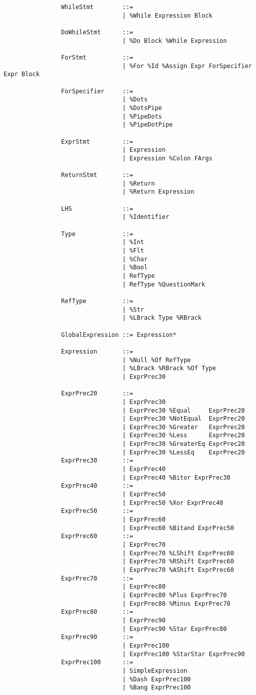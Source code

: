 \documentclass{article}
\begin{document}
\begin{verbatim}
				WhileStmt        ::=
				                 | %While Expression Block
				
				DoWhileStmt      ::=
				                 | %Do Block %While Expression
				                 
				ForStmt          ::=
				                 | %For %Id %Assign Expr ForSpecifier Expr Block
				                 
				ForSpecifier     ::=
				                 | %Dots
				                 | %DotsPipe
				                 | %PipeDots
				                 | %PipeDotPipe
				                 
				ExprStmt         ::=
				                 | Expression
				                 | Expression %Colon FArgs
				                 
				ReturnStmt       ::=
				                 | %Return
				                 | %Return Expression
				                 
				LHS              ::=
				                 | %Identifier
				                 
				Type             ::=
				                 | %Int
				                 | %Flt
				                 | %Char
				                 | %Bool
				                 | RefType
				                 | RefType %QuestionMark
				                 
				RefType          ::=
				                 | %Str
				                 | %LBrack Type %RBrack
				                 
				GlobalExpression ::= Expression*
			
				Expression       ::=
				                 | %Null %Of RefType
				                 | %LBrack %RBrack %Of Type
				                 | ExprPrec30
				
				ExprPrec20       ::= 
				                 | ExprPrec30
				                 | ExprPrec30 %Equal     ExprPrec20
				                 | ExprPrec30 %NotEqual  ExprPrec20
				                 | ExprPrec30 %Greater   ExprPrec20
				                 | ExprPrec30 %Less      ExprPrec20
				                 | ExprPrec30 %GreaterEq ExprPrec20
				                 | ExprPrec30 %LessEq    ExprPrec20
				ExprPrec30       ::=
				                 | ExprPrec40
				                 | ExprPrec40 %Bitor ExprPrec30
				ExprPrec40       ::=
				                 | ExprPrec50
				                 | ExprPrec50 %Xor ExprPrec40
				ExprPrec50       ::=
				                 | ExprPrec60
				                 | ExprPrec60 %Bitand ExprPrec50
				ExprPrec60       ::=
				                 | ExprPrec70
				                 | ExprPrec70 %LShift ExprPrec60
				                 | ExprPrec70 %RShift ExprPrec60
				                 | ExprPrec70 %AShift ExprPrec60
				ExprPrec70       ::=
				                 | ExprPrec80
				                 | ExprPrec80 %Plus ExprPrec70
				                 | ExprPrec80 %Minus ExprPrec70
				ExprPrec80       ::=
				                 | ExprPrec90
				                 | ExprPrec90 %Star ExprPrec80
				ExprPrec90       ::=
				                 | ExprPrec100
				                 | ExprPrec100 %StarStar ExprPrec90
				ExprPrec100      ::=
				                 | SimpleExpression
				                 | %Dash ExprPrec100
				                 | %Bang ExprPrec100
				                 

\end{verbatim}
\end{document}
